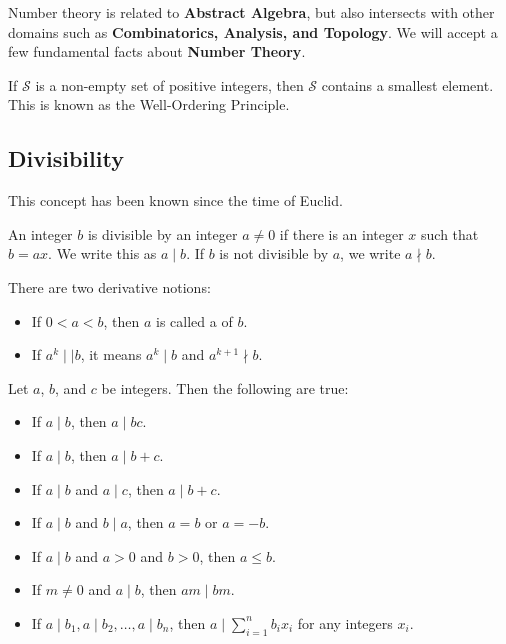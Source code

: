 \documentclass[11pt]{article}
\begin{document}
Number theory is related to \textbf{Abstract Algebra}, but also intersects with
other domains such as \textbf{Combinatorics, Analysis, and Topology}. We will
accept a few fundamental facts about \textbf{Number Theory}.

\begin{fact}
    If \(\mathcal{S}\) is a non-empty set of positive integers, then \(\mathcal{S}\) contains a smallest element. This is known as the Well-Ordering Principle.
\end{fact}

\subsection{Divisibility}
This concept has been known since the time of Euclid.

\begin{definition}
    An integer $b$ is divisible by an integer $a \neq 0$ if there is an integer $x$ such that $b = ax$. We write this as $a \mid b$. If $b$ is not divisible by $a$, we write $a \nmid b$.
\end{definition}

There are two derivative notions:
\begin{itemize}
    \item If $0 < a < b$, then $a$ is called a  of $b$.
    \item If $a^k \mid\mid b$, it means $a^k \mid b$ and $a^{k + 1} \nmid b$.
\end{itemize}

\begin{theorem}\label{1.1}
    Let $a$, $b$, and $c$ be integers. Then the following are true:
    \begin{itemize}
        \item If $a \mid b$, then $a \mid bc$.
        \item If $a \mid b$, then $a \mid b + c$.
        \item If $a \mid b$ and $a \mid c$, then $a \mid b + c$.
        \item If $a \mid b$ and $b \mid a$, then $a = b$ or $a = -b$.
        \item If $a \mid b$ and $a > 0$ and $b > 0$, then $a \leq b$.
        \item If $m \neq 0$ and $a \mid b$, then $am \mid bm$.
        \item If $a \mid b_1, a \mid b_2, \ldots, a \mid b_n$, then $a \mid \sum_{i=1}^{n}
                  b_i x_i$ for any integers $x_i$.
    \end{itemize}
\end{theorem}
\end{document}
